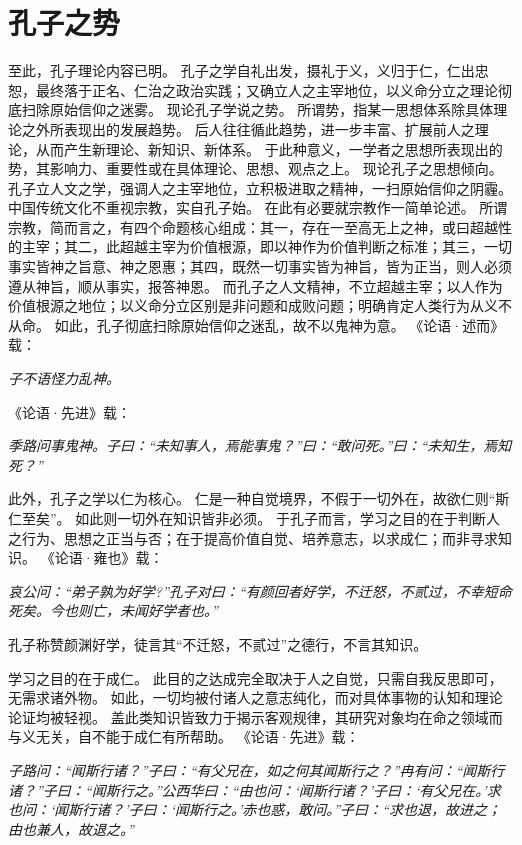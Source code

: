 \documentclass[11pt]{article}
\begin{document}
\section{孔子之势}
至此，孔子理论内容已明。
孔子之学自礼出发，摄礼于义，义归于仁，仁出忠恕，最终落于正名、仁治之政治实践；又确立人之主宰地位，以义命分立之理论彻底扫除原始信仰之迷雾。
现论孔子学说之势。
所谓势，指某一思想体系除具体理论之外所表现出的发展趋势。
后人往往循此趋势，进一步丰富、扩展前人之理论，从而产生新理论、新知识、新体系。
于此种意义，一学者之思想所表现出的势，其影响力、重要性或在具体理论、思想、观点之上。
现论孔子之思想倾向。
\newline
孔子立人文之学，强调人之主宰地位，立积极进取之精神，一扫原始信仰之阴霾。
中国传统文化不重视宗教，实自孔子始。
在此有必要就宗教作一简单论述。
所谓宗教，简而言之，有四个命题核心组成：其一，存在一至高无上之神，或曰超越性的主宰；其二，此超越主宰为价值根源，即以神作为价值判断之标准；其三，一切事实皆神之旨意、神之恩惠；其四，既然一切事实皆为神旨，皆为正当，则人必须遵从神旨，顺从事实，报答神恩。
而孔子之人文精神，不立超越主宰；以人作为价值根源之地位；以义命分立区别是非问题和成败问题；明确肯定人类行为从义不从命。
如此，孔子彻底扫除原始信仰之迷乱，故不以鬼神为意。
《论语·述而》载：

\textit{子不语怪力乱神。}

《论语·先进》载：

\textit{季路问事鬼神。子曰：“未知事人，焉能事鬼？”曰：“敢问死。”曰：“未知生，焉知死？”}

\newline

此外，孔子之学以仁为核心。
仁是一种自觉境界，不假于一切外在，故欲仁则“斯仁至矣”。
如此则一切外在知识皆非必须。
于孔子而言，学习之目的在于判断人之行为、思想之正当与否；在于提高价值自觉、培养意志，以求成仁；而非寻求知识。
《论语·雍也》载：

\textit{哀公问：“弟子孰为好学?”孔子对曰：“有颜回者好学，不迁怒，不贰过，不幸短命死矣。今也则亡，未闻好学者也。”}

孔子称赞颜渊好学，徒言其“不迁怒，不贰过”之德行，不言其知识。

\newline

学习之目的在于成仁。
此目的之达成完全取决于人之自觉，只需自我反思即可，无需求诸外物。
如此，一切均被付诸人之意志纯化，而对具体事物的认知和理论论证均被轻视。
盖此类知识皆致力于揭示客观规律，其研究对象均在命之领域而与义无关，自不能于成仁有所帮助。
《论语·先进》载：

\textit{子路问：“闻斯行诸？”子曰：“有父兄在，如之何其闻斯行之？”冉有问：“闻斯行诸？”子曰：“闻斯行之。”公西华曰：“由也问：‘闻斯行诸？’子曰：‘有父兄在。’求也问：‘闻斯行诸？’子曰：‘闻斯行之。’赤也惑，敢问。”子曰：“求也退，故进之；由也兼人，故退之。”}
\end{document}
